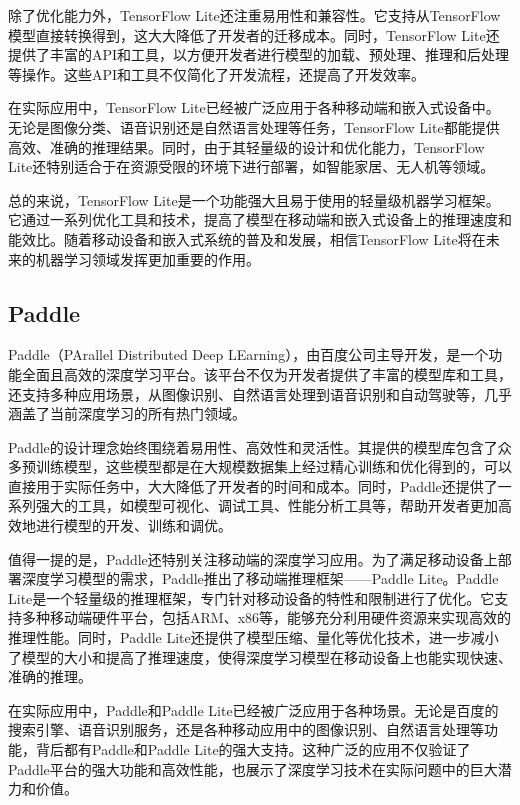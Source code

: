 除了优化能力外，TensorFlow Lite还注重易用性和兼容性。它支持从TensorFlow模型直接转换得到，这大大降低了开发者的迁移成本。同时，TensorFlow Lite还提供了丰富的API和工具，以方便开发者进行模型的加载、预处理、推理和后处理等操作。这些API和工具不仅简化了开发流程，还提高了开发效率。

在实际应用中，TensorFlow Lite已经被广泛应用于各种移动端和嵌入式设备中。无论是图像分类、语音识别还是自然语言处理等任务，TensorFlow Lite都能提供高效、准确的推理结果。同时，由于其轻量级的设计和优化能力，TensorFlow Lite还特别适合于在资源受限的环境下进行部署，如智能家居、无人机等领域。

总的来说，TensorFlow Lite是一个功能强大且易于使用的轻量级机器学习框架。它通过一系列优化工具和技术，提高了模型在移动端和嵌入式设备上的推理速度和能效比。随着移动设备和嵌入式系统的普及和发展，相信TensorFlow Lite将在未来的机器学习领域发挥更加重要的作用。

\subsection{Paddle}

Paddle（PArallel Distributed Deep LEarning），由百度公司主导开发，是一个功能全面且高效的深度学习平台。该平台不仅为开发者提供了丰富的模型库和工具，还支持多种应用场景，从图像识别、自然语言处理到语音识别和自动驾驶等，几乎涵盖了当前深度学习的所有热门领域。

Paddle的设计理念始终围绕着易用性、高效性和灵活性。其提供的模型库包含了众多预训练模型，这些模型都是在大规模数据集上经过精心训练和优化得到的，可以直接用于实际任务中，大大降低了开发者的时间和成本。同时，Paddle还提供了一系列强大的工具，如模型可视化、调试工具、性能分析工具等，帮助开发者更加高效地进行模型的开发、训练和调优。

值得一提的是，Paddle还特别关注移动端的深度学习应用。为了满足移动设备上部署深度学习模型的需求，Paddle推出了移动端推理框架——Paddle Lite。Paddle Lite是一个轻量级的推理框架，专门针对移动设备的特性和限制进行了优化。它支持多种移动端硬件平台，包括ARM、x86等，能够充分利用硬件资源来实现高效的推理性能。同时，Paddle Lite还提供了模型压缩、量化等优化技术，进一步减小了模型的大小和提高了推理速度，使得深度学习模型在移动设备上也能实现快速、准确的推理。

在实际应用中，Paddle和Paddle Lite已经被广泛应用于各种场景。无论是百度的搜索引擎、语音识别服务，还是各种移动应用中的图像识别、自然语言处理等功能，背后都有Paddle和Paddle Lite的强大支持。这种广泛的应用不仅验证了Paddle平台的强大功能和高效性能，也展示了深度学习技术在实际问题中的巨大潜力和价值。

